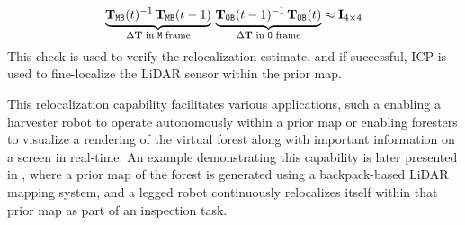 \begin{equation}
  \label{eq:cycle-relocalization}
  \underbrace{\mathbf{T}_{\mathtt{M}\mathtt{B}}(t)^{-1}\, \mathbf{T}_{\mathtt{M}\mathtt{B}}(t-1)}_{\Delta\mathbf{T} \text{ in $\mathtt{M}$ frame}}  \, \underbrace{ \mathbf{T}_{\mathtt{O}\mathtt{B}}(t-1)^{-1}\,  \mathbf{T}_{\mathtt{O}\mathtt{B}}(t)}_{\Delta\mathbf{T} \text{ in $\mathtt{O}$ frame}} \approx \mathbf{I}_{4\times4}
\end{equation}
This check is used to verify the relocalization estimate, and if successful, ICP is used to fine-localize the LiDAR sensor within the prior map.

This relocalization capability facilitates various applications, such a enabling a harvester robot to operate autonomously within a prior map or enabling foresters to visualize a rendering of the virtual forest along with important information on a screen in real-time. An example demonstrating this capability is later presented in , where a prior map of the forest is generated using a backpack-based LiDAR mapping system, and a legged robot continuously relocalizes itself within that prior map as part of an inspection task.

